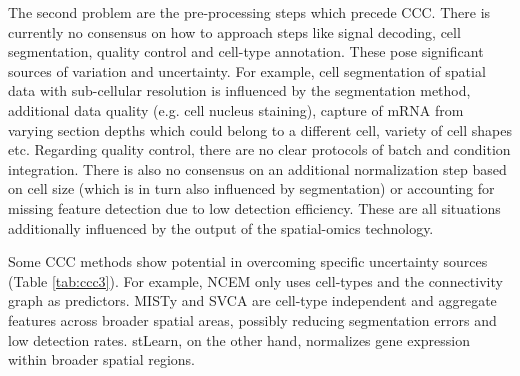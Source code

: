 The second problem are the pre-processing steps which precede CCC. There is currently no consensus on how to approach steps like signal decoding, cell segmentation, quality control and cell-type annotation. These pose significant sources of variation and uncertainty. For example, cell segmentation of spatial data with sub-cellular resolution is influenced by the segmentation method, additional data quality (e.g. cell nucleus staining), capture of mRNA from varying section depths which could belong to a different cell, variety of cell shapes etc. Regarding quality control, there are no clear protocols of batch and condition integration. There is also no consensus on an additional normalization step based on cell size (which is in turn also influenced by segmentation) or accounting for missing feature detection due to low detection efficiency. These are all situations additionally influenced by the output of the spatial-omics technology.

Some CCC methods show potential in overcoming specific uncertainty sources (Table \ref{tab:ccc3}). For example, NCEM only uses cell-types and the connectivity graph as predictors. MISTy and SVCA are cell-type independent and aggregate features across broader spatial areas, possibly reducing segmentation errors and low detection rates. stLearn, on the other hand, normalizes gene expression within broader spatial regions.

